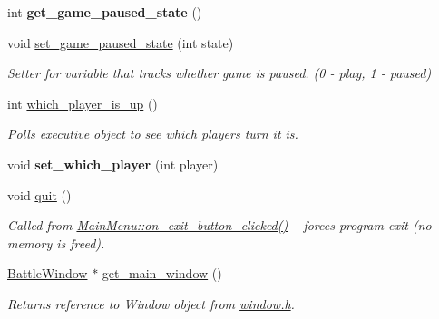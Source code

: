 \begin{DoxyCompactItemize}
\item 
\mbox{\label{classExecutive_a50f84e87213028bb5f479b41ecdfd070}} 
int {\bfseries get\+\_\+game\+\_\+paused\+\_\+state} ()
\item 
\mbox{\label{classExecutive_a660154fa665ba56fda1279e48ad69486}} 
void \mbox{\hyperlink{classExecutive_a660154fa665ba56fda1279e48ad69486}{set\+\_\+game\+\_\+paused\+\_\+state}} (int state)
\begin{DoxyCompactList}\small\item\em Setter for variable that tracks whether game is paused. (0 -\/ play, 1 -\/ paused) \end{DoxyCompactList}\item 
int \mbox{\hyperlink{classExecutive_af910b08a89311aeb591440a58a6338f0}{which\+\_\+player\+\_\+is\+\_\+up}} ()
\begin{DoxyCompactList}\small\item\em Polls executive object to see which player\textquotesingle{}s turn it is. \end{DoxyCompactList}\item 
\mbox{\label{classExecutive_acf7839b1ac33deb79af36c654a7c5afa}} 
void {\bfseries set\+\_\+which\+\_\+player} (int player)
\item 
\mbox{\label{classExecutive_a0b5ec84c4420e2857d68dc0c9efcd423}} 
void \mbox{\hyperlink{classExecutive_a0b5ec84c4420e2857d68dc0c9efcd423}{quit}} ()
\begin{DoxyCompactList}\small\item\em Called from \mbox{\hyperlink{classMainMenu_a9b9f6812f90946e135022cf5826d8eed}{Main\+Menu\+::on\+\_\+exit\+\_\+button\+\_\+clicked()}} -- forces program exit (no memory is freed). \end{DoxyCompactList}\item 
\mbox{\label{classExecutive_a97b5031314e8a65040de21d6424cb3a2}} 
\mbox{\hyperlink{classBattleWindow}{Battle\+Window}} $\ast$ \mbox{\hyperlink{classExecutive_a97b5031314e8a65040de21d6424cb3a2}{get\+\_\+main\+\_\+window}} ()
\begin{DoxyCompactList}\small\item\em Returns reference to Window object from \mbox{\hyperlink{window_8h}{window.\+h}}. \end{DoxyCompactList}\end{DoxyCompactItemize}

